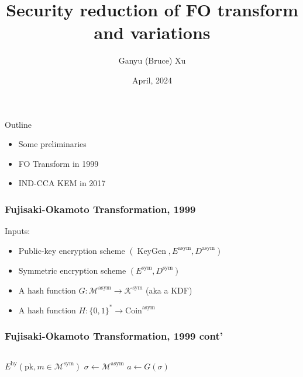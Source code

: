 \documentclass{beamer}
\title{Security reduction of FO transform and variations}
\author{Ganyu (Bruce) Xu}
\institute{University of Waterloo}
\date{April, 2024}
\begin{document}
\frame{\titlepage}

\begin{frame}{Outline}
    \begin{itemize}
        \item Some preliminaries
        \item FO Transform in 1999
        \item IND-CCA KEM in 2017
    \end{itemize}
\end{frame}

\begin{frame}
    \frametitle{Fujisaki-Okamoto Transformation, 1999}

    Inputs:
    \begin{itemize}
        \item Public-key encryption scheme $
            (\operatorname{KeyGen},
            E^\text{asym},
            D^\text{asym})
        $
        \item Symmetric encryption scheme $(E^\text{sym}, D^\text{sym})$
        \item A hash function $
            G: \mathcal{M}^\text{asym} \rightarrow \mathcal{K}^\text{sym}
        $ (aka a KDF)
        \item A hash function $
            H: \{0, 1\}^\ast \rightarrow \text{Coin}^\text{asym}
        $
    \end{itemize}

\end{frame}

\begin{frame}
    \frametitle{Fujisaki-Okamoto Transformation, 1999 cont'}

    \begin{columns}
        $E^\text{hy}(\text{pk}, m \in \mathcal{M}^\text{sym})$
        $\sigma \leftarrow \mathcal{M}^\text{asym}$
        $a \leftarrow G(\sigma)$
    \end{columns}

\end{frame}
\end{document}
